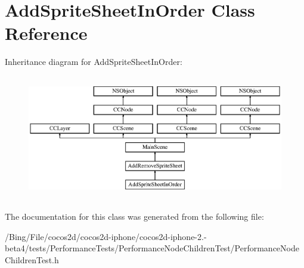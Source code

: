 \hypertarget{interface_add_sprite_sheet_in_order}{\section{Add\-Sprite\-Sheet\-In\-Order Class Reference}
\label{interface_add_sprite_sheet_in_order}
}
Inheritance diagram for Add\-Sprite\-Sheet\-In\-Order\-:\begin{figure}[H]
\begin{center}
\leavevmode
\includegraphics[height=5.490196cm]{interface_add_sprite_sheet_in_order}
\end{center}
\end{figure}


The documentation for this class was generated from the following file\-:\begin{DoxyCompactItemize}
\item 
/\-Bing/\-File/cocos2d/cocos2d-\/iphone/cocos2d-\/iphone-\/2.-\/beta4/tests/\-Performance\-Tests/\-Performance\-Node\-Children\-Test/Performance\-Node\-Children\-Test.\-h\end{DoxyCompactItemize}

